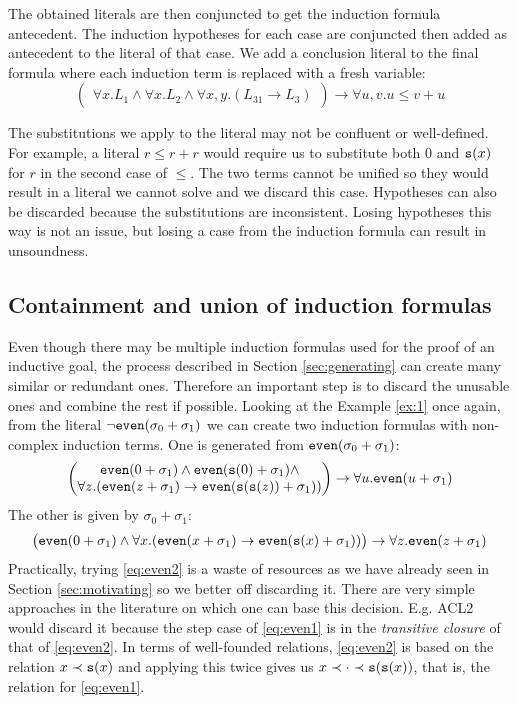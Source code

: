 The obtained literals are then conjuncted to get the induction formula antecedent. The induction hypotheses for each case are conjuncted then added as antecedent to the literal of that case. We add a conclusion literal to the final formula where each induction term is replaced with a fresh variable:
$$\begin{pmatrix}\forall x.L_1\land\forall x.L_2\land\forall x,y.(L_{31}\rightarrow L_3)\end{pmatrix}\rightarrow \forall u,v.u\leq v+u$$

The substitutions we apply to the literal may not be confluent or well-defined. For example, a literal $r\leq r+r$ would require us to substitute both $0$ and $\mathtt{s}(x)$ for $r$ in the second case of $\leq$. The two terms cannot be unified so they would result in a literal we cannot solve and we discard this case. Hypotheses can also be discarded because the substitutions are inconsistent. Losing hypotheses this way is not an issue, but losing a case from the induction formula can result in unsoundness. 

\subsection{Containment and union of induction formulas}
Even though there may be multiple induction formulas used for the proof of an inductive goal, the process described in Section \ref{sec:generating} can create many similar or redundant ones. Therefore an important step is to discard the unusable ones and combine the rest if possible. Looking at the Example \ref{ex:1} once again, from the literal $\neg\mathtt{even}(\sigma_0+\sigma_1)$ we can create two induction formulas with non-complex induction terms. One is generated from $\mathtt{even}(\sigma_0+\sigma_1)$:
\begin{equation}\label{eq:even1}\begin{pmatrix}\mathtt{even}(0+\sigma_1)\land\mathtt{even}(\mathtt{s}(0)+\sigma_1)\land\\
\forall z.(\mathtt{even}(z+\sigma_1)\rightarrow\mathtt{even}(\mathtt{s}(\mathtt{s}(z))+\sigma_1))\end{pmatrix}\rightarrow \forall u.\mathtt{even}(u+\sigma_1)\end{equation}
The other is given by $\sigma_0+\sigma_1$:
\begin{equation}\label{eq:even2}\begin{pmatrix}\mathtt{even}(0+\sigma_1)\land\forall x.(\mathtt{even}(x+\sigma_1)\rightarrow\mathtt{even}(\mathtt{s}(x)+\sigma_1))\end{pmatrix}\rightarrow \forall z.\mathtt{even}(z+\sigma_1)\end{equation}
Practically, trying \eqref{eq:even2} is a waste of resources as we have already seen in Section \ref{sec:motivating} so we better off discarding it. There are very simple approaches in the literature on which one can base this decision. E.g. \textsc{ACL2} would discard it because the step case of \eqref{eq:even1} is in the \textit{transitive closure} of that of \eqref{eq:even2}. In terms of well-founded relations, \eqref{eq:even2} is based on the relation $x\prec\mathtt{s}(x)$ and applying this twice gives us $x\prec\cdot\prec\mathtt{s}(\mathtt{s}(x))$, that is, the relation for \eqref{eq:even1}.

